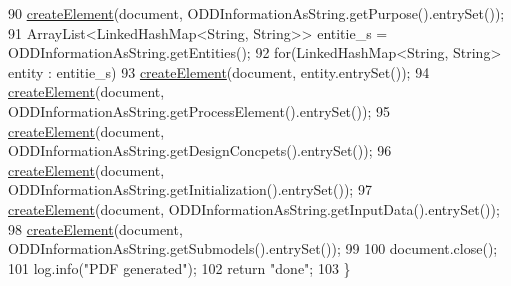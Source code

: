\begin{DoxyCode}
90         \hyperlink{classit_1_1isislab_1_1masonhelperdocumentation_1_1mason_1_1control_1_1_p_d_f_generator_ac98a9ab63c62a942fc1d410aab226e36}{createElement}(document, ODDInformationAsString.getPurpose().entrySet());
91         ArrayList<LinkedHashMap<String, String>> entitie\_s = ODDInformationAsString.getEntities();
92         \textcolor{keywordflow}{for}(LinkedHashMap<String, String> entity : entitie\_s)
93             \hyperlink{classit_1_1isislab_1_1masonhelperdocumentation_1_1mason_1_1control_1_1_p_d_f_generator_ac98a9ab63c62a942fc1d410aab226e36}{createElement}(document, entity.entrySet());
94         \hyperlink{classit_1_1isislab_1_1masonhelperdocumentation_1_1mason_1_1control_1_1_p_d_f_generator_ac98a9ab63c62a942fc1d410aab226e36}{createElement}(document, ODDInformationAsString.getProcessElement().entrySet());
95         \hyperlink{classit_1_1isislab_1_1masonhelperdocumentation_1_1mason_1_1control_1_1_p_d_f_generator_ac98a9ab63c62a942fc1d410aab226e36}{createElement}(document, ODDInformationAsString.getDesignConcpets().entrySet());
96         \hyperlink{classit_1_1isislab_1_1masonhelperdocumentation_1_1mason_1_1control_1_1_p_d_f_generator_ac98a9ab63c62a942fc1d410aab226e36}{createElement}(document, ODDInformationAsString.getInitialization().entrySet());
97         \hyperlink{classit_1_1isislab_1_1masonhelperdocumentation_1_1mason_1_1control_1_1_p_d_f_generator_ac98a9ab63c62a942fc1d410aab226e36}{createElement}(document, ODDInformationAsString.getInputData().entrySet());
98         \hyperlink{classit_1_1isislab_1_1masonhelperdocumentation_1_1mason_1_1control_1_1_p_d_f_generator_ac98a9ab63c62a942fc1d410aab226e36}{createElement}(document, ODDInformationAsString.getSubmodels().entrySet()); 
99         
100         document.close();
101         log.info(\textcolor{stringliteral}{"PDF generated"});
102         \textcolor{keywordflow}{return} \textcolor{stringliteral}{"done"};
103     \}
\end{DoxyCode}


